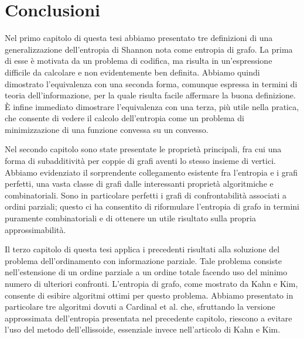 \chapter{Conclusioni}
Nel primo capitolo di questa tesi abbiamo presentato tre definizioni di una 
generalizzazione dell'entropia di Shannon nota come entropia di grafo. La 
prima di esse è motivata da un problema di codifica, ma risulta in 
un'espressione difficile da calcolare e non evidentemente ben definita. 
Abbiamo quindi dimostrato l'equivalenza con una seconda forma, comunque 
espressa in termini di teoria dell'informazione, per la quale risulta facile 
affermare la buona definizione. È infine immediato dimostrare l'equivalenza 
con una terza, più utile nella pratica, che consente di vedere il calcolo 
dell'entropia come un problema di minimizzazione di una funzione convessa su 
un convesso.

Nel secondo capitolo sono state presentate le proprietà principali, fra cui
una forma di subadditività per coppie di grafi aventi lo stesso insieme di
vertici. Abbiamo evidenziato il sorprendente collegamento esistente fra
l'entropia e i grafi perfetti, una vasta classe di grafi dalle interessanti
proprietà algoritmiche e combinatoriali. Sono in particolare perfetti i grafi
di confrontabilità associati a ordini parziali; questo ci ha consentito di
riformulare l'entropia di grafo in termini puramente combinatoriali e di
ottenere un utile risultato sulla propria approssimabilità.

Il terzo capitolo di questa tesi applica i precedenti risultati alla
soluzione del problema dell'ordinamento con informazione parziale. Tale
problema consiste nell'estensione di un ordine parziale a un ordine totale
facendo uso del minimo numero di ulteriori confronti. L'entropia di grafo,
come mostrato da Kahn e Kim, consente di esibire algoritmi ottimi per questo 
problema. Abbiamo presentato in particolare tre algoritmi dovuti a Cardinal et
al. che, sfruttando la versione approssimata dell'entropia presentata nel
precedente capitolo, riescono a evitare l'uso del metodo dell'ellissoide,
essenziale invece nell'articolo di Kahn e Kim.
